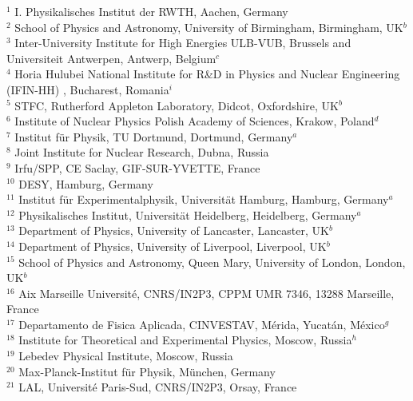 \documentclass[12pt]{article}
\begin{document}
\begin{flushleft}
{\medskip
 $ ^{1}$ I. Physikalisches Institut der RWTH, Aachen, Germany \\
 $ ^{2}$ School of Physics and Astronomy, University of Birmingham,
          Birmingham, UK$^{ b}$ \\
 $ ^{3}$ Inter-University Institute for High Energies ULB-VUB, Brussels and
          Universiteit Antwerpen, Antwerp, Belgium$^{ c}$ \\
 $ ^{4}$ Horia Hulubei National Institute for R\&D in Physics and
          Nuclear Engineering (IFIN-HH) , Bucharest, Romania$^{ i}$ \\
 $ ^{5}$ STFC, Rutherford Appleton Laboratory, Didcot, Oxfordshire, UK$^{ b}$ \\
 $ ^{6}$ Institute of Nuclear Physics Polish Academy of Sciences,
          Krakow, Poland$^{ d}$ \\
 $ ^{7}$ Institut f\"ur Physik, TU Dortmund, Dortmund, Germany$^{ a}$ \\
 $ ^{8}$ Joint Institute for Nuclear Research, Dubna, Russia \\
 $ ^{9}$ Irfu/SPP, CE Saclay, GIF-SUR-YVETTE, France \\
 $ ^{10}$ DESY, Hamburg, Germany \\
 $ ^{11}$ Institut f\"ur Experimentalphysik, Universit\"at Hamburg,
          Hamburg, Germany$^{ a}$ \\
 $ ^{12}$ Physikalisches Institut, Universit\"at Heidelberg,
          Heidelberg, Germany$^{ a}$ \\
 $ ^{13}$ Department of Physics, University of Lancaster,
          Lancaster, UK$^{ b}$ \\
 $ ^{14}$ Department of Physics, University of Liverpool,
          Liverpool, UK$^{ b}$ \\
 $ ^{15}$ School of Physics and Astronomy, Queen Mary, University of London,
          London, UK$^{ b}$ \\
 $ ^{16}$ Aix Marseille Universit\'{e}, CNRS/IN2P3, CPPM UMR 7346,
          13288 Marseille, France \\
 $ ^{17}$ Departamento de Fisica Aplicada,
          CINVESTAV, M\'erida, Yucat\'an, M\'exico$^{ g}$ \\
 $ ^{18}$ Institute for Theoretical and Experimental Physics,
          Moscow, Russia$^{ h}$ \\
 $ ^{19}$ Lebedev Physical Institute, Moscow, Russia \\
 $ ^{20}$ Max-Planck-Institut f\"ur Physik, M\"unchen, Germany \\
 $ ^{21}$ LAL, Universit\'e Paris-Sud, CNRS/IN2P3, Orsay, France \\
}
\end{flushleft}
\end{document}
